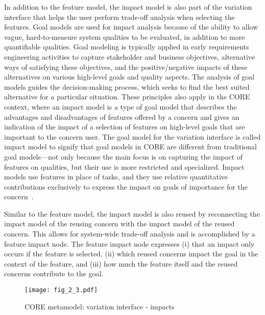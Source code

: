 In addition to the feature model, the impact model is also part of the variation interface that helps the user perform trade-off analysis when selecting the features. Goal models are used for impact analysis because of the ability to allow vague, hard-to-measure system qualities to be evaluated, in addition to more quantifiable qualities. Goal modeling is typically applied in early requirements engineering activities to capture stakeholder and business objectives, alternative ways of satisfying these objectives, and the positive/negative impacts of these alternatives on various high-level goals and quality aspects. The analysis of goal models guides the decision-making process, which seeks to find the best suited alternative for a particular situation. These principles also apply in the CORE context, where an impact model is a type of goal model that describes the advantages and disadvantages of features offered by a concern and gives an indication of the impact of a selection of features on high-level goals that are important to the concern user. The goal model for the variation interface is called impact model to signify that goal models in CORE are different from traditional goal models---not only because the main focus is on capturing the impact of features on qualities, but their use is more restricted and specialized. Impact models use features in place of tasks, and they use relative quantitative contributions exclusively to express the impact on goals of importance for the concern~\cite{duran2015reuse}.

Similar to the feature model, the impact model is also reused by reconnecting the impact model of the reusing concern with the impact model of the reused concern. This allows for system-wide trade-off analysis and is accomplished by a feature impact node. The feature impact node expresses (i) that an impact only occurs if the feature is selected, (ii) which reused concerns impact the goal in the context of the feature, and (iii) how much the feature itself and the reused concerns contribute to the goal.

\begin{figure}
	\centering
	\texttt{[image: fig\_2\_3.pdf]}
	\caption{CORE metamodel: variation interface - impacts}
	\label{fig:2.3}
\end{figure}

